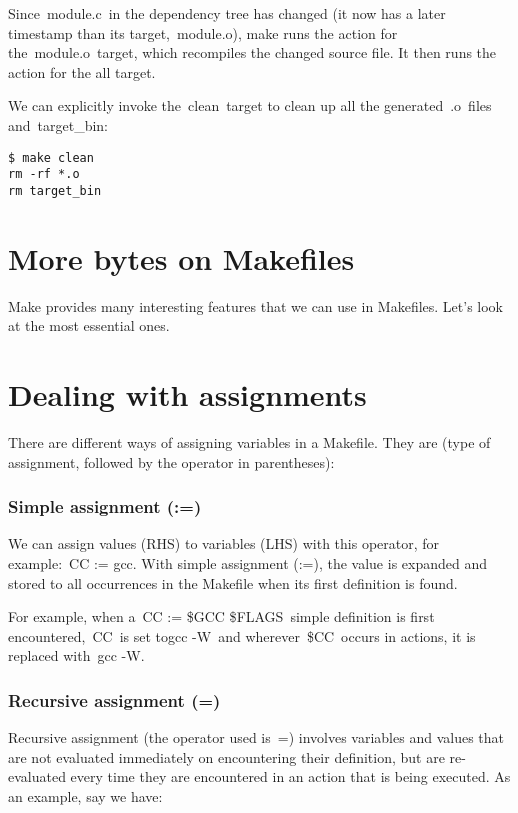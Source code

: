 \documentclass[12pt]{article}
\begin{document}
Since module.c in the dependency tree has changed (it now has a later timestamp than its target, module.o), make runs the action for the module.o target, which recompiles the changed source file. It then runs the action for the all target.

We can explicitly invoke the clean target to clean up all the generated .o files and target\_bin:

\begin{verbatim}
$ make clean
rm -rf *.o
rm target_bin
\end{verbatim}

\section *{More bytes on Makefiles}

Make provides many interesting features that we can use in Makefiles. Let’s look at the most essential ones.

\section *{Dealing with assignments}

There are different ways of assigning variables in a Makefile. They are (type of assignment, followed by the operator in parentheses):

\subsubsection *{Simple assignment (:=)}

We can assign values (RHS) to variables (LHS) with this operator, for example: CC := gcc. With simple assignment (:=), the value is expanded and stored to all occurrences in the Makefile when its first definition is found.

For example, when a CC := \${GCC} \${FLAGS} simple definition is first encountered, CC is set togcc -W and wherever \${CC} occurs in actions, it is replaced with gcc -W.

\subsubsection *{Recursive assignment (=)}

Recursive assignment (the operator used is =) involves variables and values that are not evaluated immediately on encountering their definition, but are re-evaluated every time they are encountered in an action that is being executed. As an example, say we have:
\end{document}
